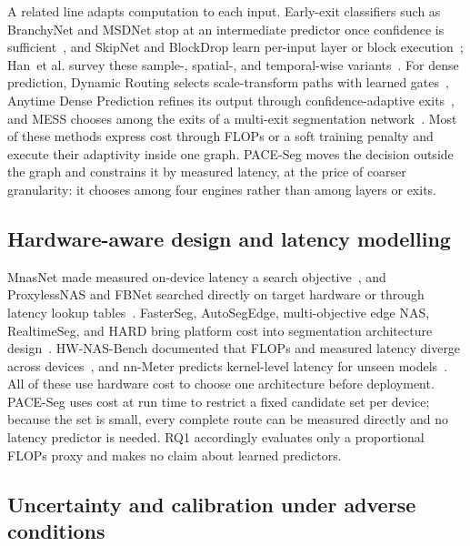 \documentclass[a4paper,5p]{elsarticle}
\newcommand{\method}{PACE-Seg}
\newcommand{\etal}{et al.}
\begin{document}
A related line adapts computation to each input. Early-exit classifiers such as BranchyNet and MSDNet stop at an intermediate predictor once confidence is sufficient~\cite{teerapittayanon2016branchynet,huang2018msdnet}, and SkipNet and BlockDrop learn per-input layer or block execution~\cite{wang2018skipnet,wu2018blockdrop}; Han~\etal{} survey these sample-, spatial-, and temporal-wise variants~\cite{han2022dynamic}. For dense prediction, Dynamic Routing selects scale-transform paths with learned gates~\cite{li2020dynamic}, Anytime Dense Prediction refines its output through confidence-adaptive exits~\cite{liu2022anytime}, and MESS chooses among the exits of a multi-exit segmentation network~\cite{kouris2022mess}. Most of these methods express cost through FLOPs or a soft training penalty and execute their adaptivity inside one graph. \method{} moves the decision outside the graph and constrains it by measured latency, at the price of coarser granularity: it chooses among four engines rather than among layers or exits.

\subsection{Hardware-aware design and latency modelling}

MnasNet made measured on-device latency a search objective~\cite{tan2019mnasnet}, and ProxylessNAS and FBNet searched directly on target hardware or through latency lookup tables~\cite{cai2019proxylessnas,wu2019fbnet}. FasterSeg, AutoSegEdge, multi-objective edge NAS, RealtimeSeg, and HARD bring platform cost into segmentation architecture design~\cite{chen2020fasterseg,dou2023autosegedge,dou2024multiobjective,li2023realtimeseg,kwon2024hard}. HW-NAS-Bench documented that FLOPs and measured latency diverge across devices~\cite{li2021hwnasbench}, and nn-Meter predicts kernel-level latency for unseen models~\cite{zhang2021nnmeter}. All of these use hardware cost to choose one architecture before deployment. \method{} uses cost at run time to restrict a fixed candidate set per device; because the set is small, every complete route can be measured directly and no latency predictor is needed. RQ1 accordingly evaluates only a proportional FLOPs proxy and makes no claim about learned predictors.

\subsection{Uncertainty and calibration under adverse conditions}
\end{document}
